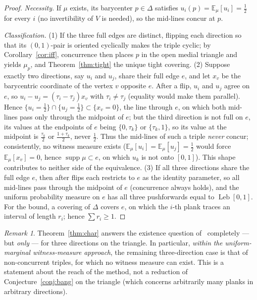 \documentclass[11pt,reqno]{amsart}
\theoremstyle{plain}
\theoremstyle{definition}
\theoremstyle{remark}
\newtheorem{remark}[theorem]{Remark}
\newcommand{\Leb}{\operatorname{Leb}}
\begin{document}
\begin{proof}
\emph{Necessity.} If $\mu$ exists, its barycenter $p\in\Delta$ satisfies
$u_i(p)=\mathbb E_\mu[u_i]=\tfrac12$ for every $i$ (no invertibility of $V$ is
needed), so the mid-lines concur at $p$.

\emph{Classification.} (1) If the three full edges are distinct, flipping each
direction so that its $(0,1)$-pair is oriented cyclically makes the triple
cyclic; by Corollary~\ref{cor:iff}, concurrence then places $p$ in the open
medial triangle and yields $\mu_p$, and Theorem~\ref{thm:tight} the unique
tight covering. (2) Suppose exactly two directions, say $u_i$ and $u_j$, share
their full edge $e$, and let $x_v$ be the barycentric coordinate of the vertex
$v$ opposite $e$. After a flip, $u_i$ and $u_j$ agree on $e$, so
$u_i-u_j=(\tau_i-\tau_j)x_v$ with $\tau_i\ne\tau_j$ (equality would make them
parallel). Hence $\{u_i=\tfrac12\}\cap\{u_j=\tfrac12\}\subset\{x_v=0\}$, the
line through $e$, on which both mid-lines pass only through the midpoint of
$e$; but the third direction is not full on $e$, its values at the endpoints of
$e$ being $\{0,\tau_k\}$ or $\{\tau_k,1\}$, so its value at the midpoint is
$\tfrac{\tau_k}2$ or $\tfrac{1+\tau_k}2$, never $\tfrac12$. Thus the mid-lines
of such a triple \emph{never} concur; consistently, no witness measure exists
($\mathbb E_\mu[u_i]=\mathbb E_\mu[u_j]=\tfrac12$ would force
$\mathbb E_\mu[x_v]=0$, hence $\operatorname{supp}\mu\subset e$, on which $u_k$
is not onto $[0,1]$). This shape contributes to neither side of the
equivalence. (3) If all three directions share the full edge $e$, then after
flips each restricts to $e$ as the identity parameter, so all mid-lines pass
through the midpoint of $e$ (concurrence always holds), and the uniform
probability measure on $e$ has all three pushforwards equal to $\Leb[0,1]$.
For the bound, a covering of $\Delta$ covers $e$, on which the $i$-th plank
traces an interval of length $r_i$; hence $\sum r_i\ge1$.
\end{proof}

\begin{remark}\label{rem:charscope}
Theorem~\ref{thm:char} answers the existence question of~\cite{Gardner88}
completely --- but \emph{only} --- for three directions on the triangle. In
particular, \emph{within the
uniform-marginal witness-measure approach}, the remaining three-direction case
is that of non-concurrent triples, for which no witness measure can exist. This
is a statement about the reach of the method, not a reduction of
Conjecture~\ref{conj:bang} on the triangle (which concerns arbitrarily many
planks in arbitrary directions).
\end{remark}
\end{document}
